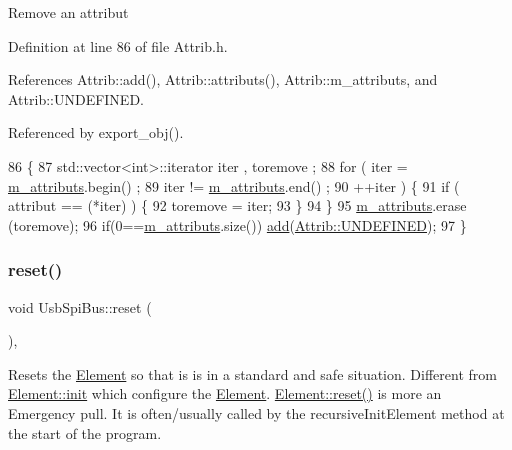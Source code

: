 Remove an attribut 

Definition at line 86 of file Attrib.\+h.



References Attrib\+::add(), Attrib\+::attributs(), Attrib\+::m\+\_\+attributs, and Attrib\+::\+U\+N\+D\+E\+F\+I\+N\+ED.



Referenced by export\+\_\+obj().


\begin{DoxyCode}
86                                \{
87     std::vector<int>::iterator iter , toremove ;
88     \textcolor{keywordflow}{for} ( iter  = \hyperlink{classAttrib_ac4bd58a0cc6b38a3b711d609a3d3aacc}{m\_attributs}.begin() ;
89           iter != \hyperlink{classAttrib_ac4bd58a0cc6b38a3b711d609a3d3aacc}{m\_attributs}.end()   ;
90           ++iter ) \{
91       \textcolor{keywordflow}{if} ( attribut == (*iter) ) \{
92         toremove = iter;
93       \}
94     \}
95     \hyperlink{classAttrib_ac4bd58a0cc6b38a3b711d609a3d3aacc}{m\_attributs}.erase (toremove);
96     \textcolor{keywordflow}{if}(0==\hyperlink{classAttrib_ac4bd58a0cc6b38a3b711d609a3d3aacc}{m\_attributs}.size()) \hyperlink{classAttrib_a235f773af19c900264a190b00a3b4ad7}{add}(\hyperlink{classAttrib_a69e171d7cc6417835a5a306d3c764235a3a8da2ab97dda18aebab196fe4100531}{Attrib::UNDEFINED});
97   \}
\end{DoxyCode}
\mbox{\label{classUsbSpiBus_aa795a27f7429f0c0285056964659d433}} 
\subsubsection{\texorpdfstring{reset()}{reset()}}
{\footnotesize\ttfamily void Usb\+Spi\+Bus\+::reset (\begin{DoxyParamCaption}{ }\end{DoxyParamCaption})\hspace{0.3cm}{\ttfamily [inline]}, {\ttfamily [virtual]}}

Resets the \hyperlink{classElement}{Element} so that is is in a standard and safe situation. Different from \hyperlink{classElement_af42754b5cabc198869222725218d695c}{Element\+::init} which configure the \hyperlink{classElement}{Element}. \hyperlink{classElement_a69efffa22f06909d768149715565cb56}{Element\+::reset()} is more an Emergency pull. It is often/usually called by the recursive\+Init\+Element method at the start of the program. 

